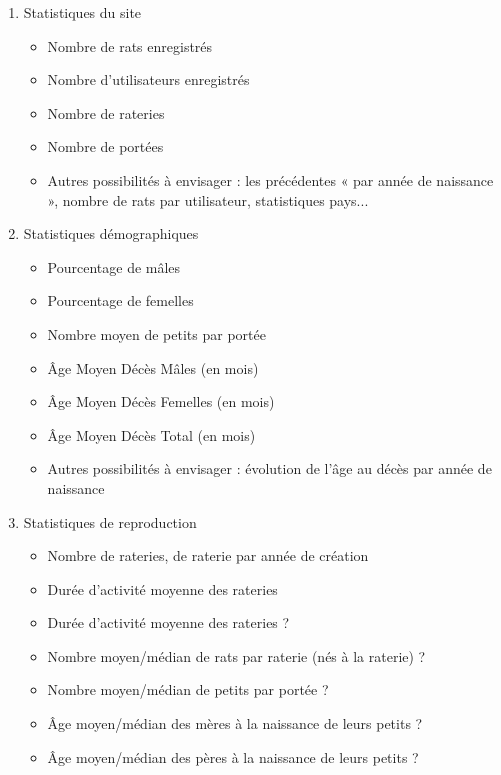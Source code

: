 ﻿\documentclass[a4paper,10pt]{article}
\begin{document}
\begin{enumerate}
\item Statistiques du site
\begin{itemize}
\item Nombre de rats enregistrés
\item Nombre d'utilisateurs enregistrés
\item Nombre de rateries
\item Nombre de portées
\item Autres possibilités à envisager : les précédentes « par année de naissance », nombre de rats par utilisateur, statistiques pays...
\end{itemize}

\item Statistiques démographiques
\begin{itemize}
\item Pourcentage de mâles
\item Pourcentage de femelles
\item Nombre moyen de petits par portée
\item Âge Moyen Décès Mâles (en mois)
\item Âge Moyen Décès Femelles (en mois)
\item Âge Moyen Décès Total (en mois)
\item Autres possibilités à envisager : évolution de l'âge au décès par année de naissance
\end{itemize}

\item Statistiques de reproduction
\begin{itemize}
\item Nombre de rateries, de raterie par année de création
\item Durée d'activité moyenne des rateries
\item Durée d'activité moyenne des rateries ?
\item Nombre moyen/médian de rats par raterie (nés à la raterie) ?
\item Nombre moyen/médian de petits par portée ?
\item Âge moyen/médian des mères à la naissance de leurs petits ?
\item Âge moyen/médian des pères à la naissance de leurs petits ?
\end{itemize}


\end{enumerate}
\end{document}
